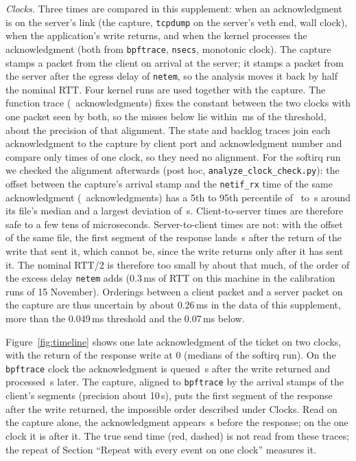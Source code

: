\documentclass[9pt]{article}
\newcommand{\ms}{\,ms\xspace}
\begin{document}
\emph{Clocks.} Three times are compared in this supplement: when an acknowledgment is on the server's link (the capture, \texttt{tcpdump} on the server's veth end, wall clock), when the application's write returns, and when the kernel processes the acknowledgment (both from \texttt{bpftrace}, \texttt{nsecs}, monotonic clock). The capture stamps a packet from the client on arrival at the server; it stamps a packet from the server after the egress delay of \texttt{netem}, so the analysis moves it back by half the nominal RTT. Four kernel runs are used together with the capture. The function trace (\KerN\ acknowledgments) fixes the constant between the two clocks with one packet seen by both, so the misses below lie within \KerMissNear\ms of the threshold, about the precision of that alignment. The state and backlog traces join each acknowledgment to the capture by client port and acknowledgment number and compare only times of one clock, so they need no alignment. For the softirq run we checked the alignment afterwards (post hoc, \texttt{analyze\_clock\_check.py}): the offset between the capture's arrival stamp and the \texttt{netif\_rx} time of the same acknowledgment (\ClkN\ acknowledgments) has a 5th to 95th percentile of \ClkLo\ to \ClkHi\,\textmu s around its file's median and a largest deviation of \ClkMax\,\textmu s. Client-to-server times are therefore safe to a few tens of microseconds. Server-to-client times are not: with the offset of the same file, the first segment of the response lands \ClkWriteAbs\,\textmu s after the return of the write that sent it, which cannot be, since the write returns only after it has sent it. The nominal RTT/2 is therefore too small by about that much, of the order of the excess delay \texttt{netem} adds (0.3\ms of RTT on this machine in the calibration runs of 15 November). Orderings between a client packet and a server packet on the capture are thus uncertain by about 0.26\ms in the data of this supplement, more than the 0.049\ms threshold and the 0.07\ms below.

Figure~\ref{fig:timeline} shows one late acknowledgment of the ticket on two clocks, with the return of the response write at 0 (medians of the softirq run). On the \texttt{bpftrace} clock the acknowledgment is queued \HEnqMed\,\textmu s after the write returned and processed \HWaitMed\,\textmu s later. The capture, aligned to \texttt{bpftrace} by the arrival stamps of the client's segments (precision about 10\,\textmu s), puts the first segment of the response after the write returned, the impossible order described under Clocks. Read on the capture alone, the acknowledgment appears \HPcapMedAbsUs\,\textmu s before the response; on the one clock it is after it. The true send time (red, dashed) is not read from these traces; the repeat of Section ``Repeat with every event on one clock'' measures it.
\end{document}
